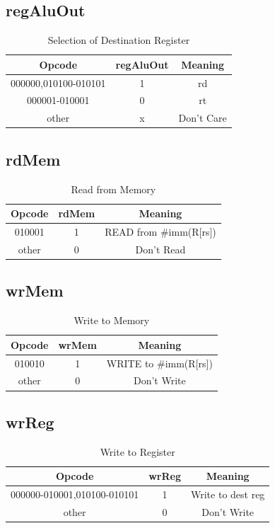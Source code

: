 \documentclass{article}
\begin{document}
\subsection{regAluOut}
\begin{table}[H]
    \centering
    \begin{tabular}{|c|c|c|}
        \hline
        \textbf{Opcode} & \textbf{regAluOut} & \textbf{Meaning} \\
        \hline
        000000,010100-010101 & 1 & rd \\
        000001-010001 & 0 & rt \\
        other & x & Don't Care \\
        \hline
    \end{tabular}
    \caption{Selection of Destination Register}
\end{table}

\subsection{rdMem}
\begin{table}[H]
    \centering
    \begin{tabular}{|c|c|c|}
        \hline
        \textbf{Opcode} & \textbf{rdMem} & \textbf{Meaning} \\
        \hline
        010001 & 1 & READ from \#imm(R[rs]) \\
        other & 0 & Don't Read \\
        \hline
    \end{tabular}
    \caption{Read from Memory}
\end{table}

\subsection{wrMem}
\begin{table}[H]
    \centering
    \begin{tabular}{|c|c|c|}
        \hline
        \textbf{Opcode} & \textbf{wrMem} & \textbf{Meaning} \\
        \hline
        010010 & 1 & WRITE to \#imm(R[rs]) \\
        other & 0 & Don't Write \\
        \hline
    \end{tabular}
    \caption{Write to Memory}
\end{table}

\subsection{wrReg}
\begin{table}[H]
    \centering
    \begin{tabular}{|c|c|c|}
        \hline
        \textbf{Opcode} & \textbf{wrReg} & \textbf{Meaning} \\
        \hline
        000000-010001,010100-010101 & 1 & Write to dest reg \\
        other & 0 & Don't Write \\
        \hline
    \end{tabular}
    \caption{Write to Register}
\end{table}
\end{document}
